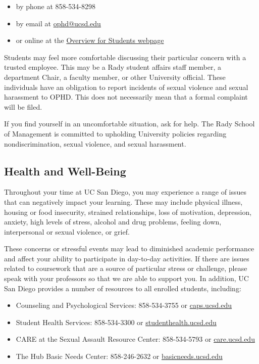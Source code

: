 \documentclass[12pt]{article}
\begin{document}
\begin{itemize}
    \item by phone at 858-534-8298
    \item by email at \href{mailto:ophd@ucsd.edu}{ophd@ucsd.edu}
    \item or online at the \href{http://ophd.ucsd.edu/policies-procedures/polpro_student.html}{Overview for Students webpage}
\end{itemize}

Students may feel more comfortable discussing their particular concern with a trusted employee. This may be a Rady student affairs staff member, a department Chair, a faculty member, or other University official. These individuals have an obligation to report incidents of sexual violence and sexual harassment to OPHD. This does not necessarily mean that a formal complaint will be filed. 
 
If you find yourself in an uncomfortable situation, ask for help. The Rady School of Management is committed to upholding University policies regarding nondiscrimination, sexual violence, and sexual harassment.

\vspace{0.5cm}


\subsection*{Health and Well-Being}

Throughout your time at UC San Diego, you may experience a range of issues that can negatively impact your learning. These may include physical illness, housing or food insecurity, strained relationships, loss of motivation, depression, anxiety, high levels of stress, alcohol and drug problems, feeling down, interpersonal or sexual violence, or grief.

These concerns or stressful events may lead to diminished academic performance and affect your ability to participate in day-to-day activities. If there are issues related to coursework that are a source of particular stress or challenge, please speak with your professors so that we are able to support you. In addition, UC San Diego provides a number of resources to all enrolled students, including:

\begin{itemize}
    \item Counseling and Psychological Services: 858-534-3755 or \href{http://caps.ucsd.edu}{caps.ucsd.edu}
    \item Student Health Services: 858-534-3300 or \href{http://studenthealth.ucsd.edu}{studenthealth.ucsd.edu}
    \item CARE at the Sexual Assault Resource Center: 858-534-5793 or \href{http://care.ucsd.edu}{care.ucsd.edu}
    \item The Hub Basic Needs Center: 858-246-2632 or \href{http://basicneeds.ucsd.edu}{basicneeds.ucsd.edu}
\end{itemize}
\end{document}
